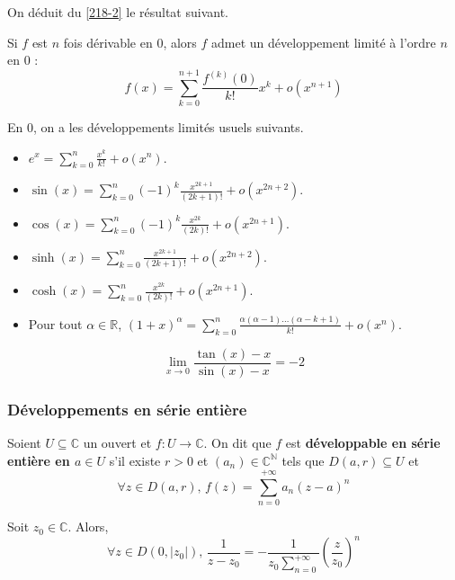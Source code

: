 	On déduit du \cref{218-2} le résultat suivant.
	
	\begin{proposition}
		Si $f$ est $n$ fois dérivable en $0$, alors $f$ admet un développement limité à l'ordre $n$ en $0$ :
		\[ f(x) = \sum_{k=0}^{n+1} \frac{f^{(k)} (0)}{k!} x^k + o(x^{n+1}) \]
	\end{proposition}
	
	\begin{example}
		En $0$, on a les développements limités usuels suivants.
		\begin{itemize}
			\item $e^x = \sum_{k=0}^{n} \frac{x^k}{k!} + o(x^n)$.
			\item $\sin(x) = \sum_{k=0}^{n} (-1)^{k} \frac{x^{2k+1}}{(2k+1)!} + o(x^{2n+2})$.
			\item $\cos(x) = \sum_{k=0}^{n} (-1)^{k} \frac{x^{2k}}{(2k)!} + o(x^{2n+1})$.
			\item $\sinh(x) = \sum_{k=0}^{n} \frac{x^{2k+1}}{(2k+1)!} + o(x^{2n+2})$.
			\item $\cosh(x) = \sum_{k=0}^{n} \frac{x^{2k}}{(2k)!} + o(x^{2n+1})$.
			\item Pour tout $\alpha \in \mathbb{R}$, $(1+x)^\alpha = \sum_{k=0}^n \frac{\alpha(\alpha - 1) \dots (\alpha -k+1)}{k!} + o(x^n)$.
		\end{itemize}
	\end{example}
	
	\begin{application}
		\[ \lim_{x \rightarrow 0} \frac{\tan(x) - x}{\sin(x) - x} = -2 \]
	\end{application}
	
	\subsubsection{Développements en série entière}
	
	
	\begin{definition}
		Soient $U \subseteq \mathbb{C}$ un ouvert et $f : U \rightarrow \mathbb{C}$. On dit que $f$ est \textbf{développable en série entière en $a \in U$} s'il existe $r > 0$ et $(a_n) \in \mathbb{C}^{\mathbb{N}}$ tels que $D(a, r) \subseteq U$ et
		\[ \forall z \in D(a, r), \, f(z) = \sum_{n=0}^{+\infty} a_n (z-a)^n \]
	\end{definition}
	
	
	\begin{example}
		Soit $z_0 \in \mathbb{C}$. Alors,
		\[ \forall z \in D(0,\vert z_0 \vert), \, \frac{1}{z-z_0} = -\frac{1}{z_0 \sum_{n=0}^{+\infty}} \left( \frac{z}{z_0} \right)^n \]
	\end{example}
	
